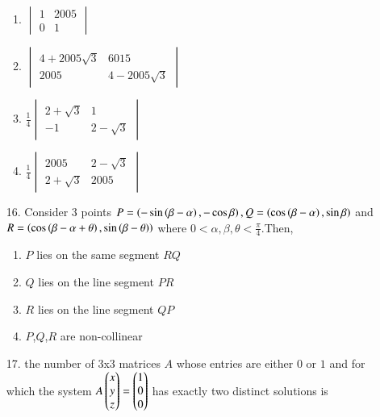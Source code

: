 \documentclass[journal,12pt,twocolumn]{IEEEtran}
\theoremstyle{remark}
\begin{document}
\begin{enumerate}
			\begin{enumerate}[label=(\alph*)]
				\item $\begin{vmatrix} 1 & 2005\\0 & 1 \end{vmatrix}$
				 \item $\begin{vmatrix} 4 + 2005\sqrt{3} & 6015 \\ 2005 & 4 - 2005\sqrt{3}\end{vmatrix}$
					 \item $\frac{1}{4}\begin{vmatrix}2 + \sqrt{3} & 1 \\ -1 & 2 -\sqrt{3}\end{vmatrix}$
						 \item $\frac{1}{4}\begin{vmatrix}2005 & 2 - \sqrt{3} \\ 2 + \sqrt{3} & 2005\end{vmatrix}$
			\end{enumerate}		
		\item[16.] Consider 3 points $P=\left(-\sin \left(\beta - \alpha\right), - \cos\beta\right), Q = \left(\cos \left(\beta - \alpha\right), \sin\beta\right)$ and $R = \left(\cos \left(\beta - \alpha + \theta\right), \sin\left(\beta - \theta\right)\right)$ where $0<\alpha,\beta,\theta<\frac{\pi}{4}.$Then, \hfill{}
			\begin{enumerate}[label = (\alph*)]
				\item $P$ lies on the same segment $RQ$
				\item $Q$ lies on the line segment $PR$
				\item $R$ lies on the line segment $QP$
				\item $P$,$Q$,$R$ are non-collinear
			\end{enumerate}
	\item[17.] the number of 3x3 matrices $A$ whose entries are either $0$ or $1$ and for which the system $A\begin{pmatrix}x\\y\\z\end{pmatrix}=\begin{pmatrix}1\\0\\0\end{pmatrix}$ has exactly two distinct solutions is \hfill{}


\end{enumerate}
\end{document}
